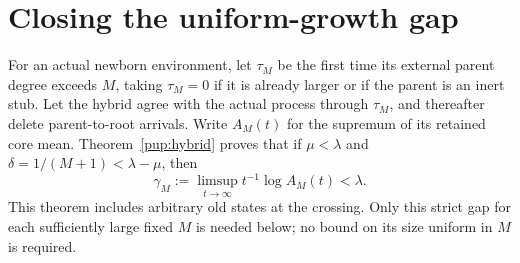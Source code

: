 \section{Closing the uniform-growth gap}
\label{erc:closure-section}

For an actual newborn environment, let $\tau_M$ be the first time its
external parent degree exceeds $M$, taking $\tau_M=0$ if it is already
larger or if the parent is an inert stub.  Let the hybrid agree with the actual process through
$\tau_M$, and thereafter delete parent-to-root arrivals.  Write
$A_M(t)$ for the supremum of its retained core mean.  Theorem~\ref{pup:hybrid} proves that if
$\mu<\lambda$ and $\delta=1/(M+1)<\lambda-\mu$, then
\begin{equation}\label{erc:hybrid-assumption}
 \gamma_M:=\limsup_{t\to\infty}t^{-1}\log A_M(t)<\lambda.
\end{equation}
This theorem includes arbitrary old states at the
crossing.  Only this strict gap for each sufficiently large fixed $M$
is needed below; no bound on its size uniform in $M$ is required.

